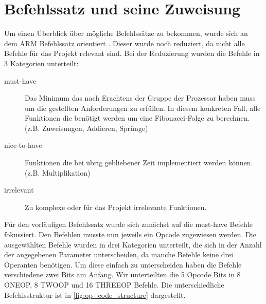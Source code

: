 \documentclass[paper=a4,fontsize=11pt,twocolumn]{scrreprt}
\begin{document}
\section{Befehlssatz und seine Zuweisung}
\label{ch:befehlssatz_und_seine_zuweisung}
Um einen Überblick über mögliche Befehlssätze zu bekommen, wurde sich an dem ARM Befehlssatz orientiert \autocite{ARMBefehlssatz}.
Dieser wurde noch reduziert, da nicht alle Befehle für das Projekt relevant sind.
Bei der Reduzierung wurden die Befehle in 3 Kategorien unterteilt:

\begin{description}
    \item[must-have]
    Das Minimum das nach Erachtens der Gruppe der Prozessor haben muss um die gestellten Anforderungen zu erfüllen. In diesem konkreten Fall, alle Funktionen die benötigt werden um eine Fibonacci-Folge zu berechnen. (z.B. Zuweisungen, Addieren, Sprünge) 
    \item[nice-to-have]
    Funktionen die bei übrig gebliebener Zeit implementiert werden können.(z.B. Multiplikation)
    \item[irrelevant]
    Zu komplexe oder für das Projekt irrelevante Funktionen.
\end{description}

Für den vorläufigen Befehlssatz wurde sich zunächst auf die must-have Befehle fokussiert.
Den Befehlen musste nun jeweils ein Opcode zugewiesen werden.
Die ausgewählten Befehle wurden in drei Kategorien unterteilt, die sich in der Anzahl der angegebenen Parameter unterscheiden, da manche Befehle keine drei Operanten benötigen.
Um diese einfach zu unterscheiden haben die Befehle verschiedene zwei Bits am Anfang.
Wir unterteilten die 5 Opcode Bits in 8 ONEOP, 8 TWOOP und 16 THREEOP Befehle.
Die unterschiedliche Befehlsstruktur ist in \ref{fig:op_code_structure} dargestellt.
\end{document}
